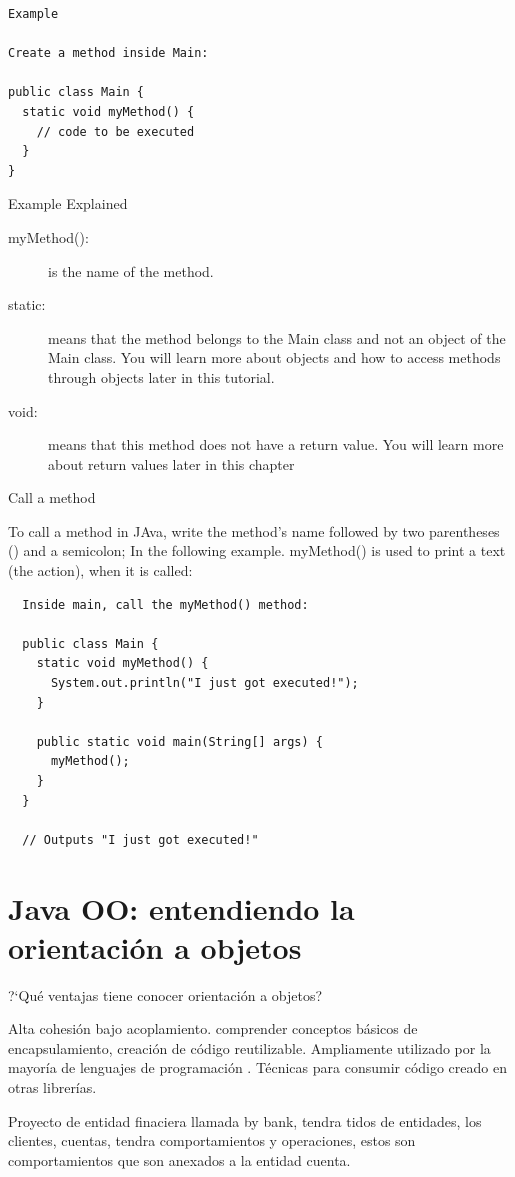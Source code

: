 \begin{verbatim}
Example

Create a method inside Main:

public class Main {
  static void myMethod() {
    // code to be executed
  }
}
\end{verbatim}

Example Explained
\begin{description}
  \item[myMethod(): ] is the name of the method.
  \item[static: ] means that the method belongs to the Main class and not an object of the Main class. You will learn more about objects and how to access methods through objects later in this tutorial.
  \item[void: ] means that this method does not have a return value. You will learn more about return values later in this chapter
\end{description}
    
Call a method 

To call a method in JAva, write the method's name followed by two parentheses () and a semicolon; In the following example. myMethod() is 
used to print a text (the action), when it is called: 

\begin{verbatim}
  Inside main, call the myMethod() method:

  public class Main {
    static void myMethod() {
      System.out.println("I just got executed!");
    }
  
    public static void main(String[] args) {
      myMethod();
    }
  }
  
  // Outputs "I just got executed!"
\end{verbatim}
    

\chapter{Java OO: entendiendo la orientaci\'on a objetos}

?`Qu\'e ventajas tiene conocer orientaci\'on a objetos?

Alta cohesi\'on bajo acoplamiento. comprender conceptos b\'asicos de encapsulamiento, 
creaci\'on de c\'odigo reutilizable. Ampliamente utilizado por la mayor\'ia de lenguajes de programaci\'on .
T\'ecnicas para consumir c\'odigo creado en otras librer\'ias.


Proyecto de entidad finaciera llamada  by bank, tendra tidos de entidades, los clientes, cuentas, tendra comportamientos y 
operaciones, estos son comportamientos que son anexados a la entidad cuenta. 

